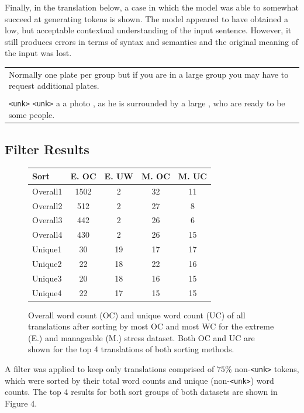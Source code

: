 \documentclass[11pt,a4paper]{article}
\begin{document}
Finally, in the translation below, a case in which the model was able to somewhat succeed at generating tokens is shown. The model appeared to have obtained a  low, but acceptable contextual understanding of the input sentence. However, it still produces errors in terms of syntax and semantics and the original meaning of the input was lost.
\begin{center}
\begin{tabular}{p{2.5in}}
    \hline
    Normally one plate per group but if you are in a large group you may have to request additional plates.\\
    \\
    \verb|<unk>| \verb|<unk>| a a photo , as he is surrounded by a large , who are ready to be some people.\\
    \hline
\end{tabular}
\end{center}


\subsection{Filter Results}
\begin{figure}[h]
    \centering
    \begin{tabular}{| l || c | c || c | c |}
    \hline
    Sort & E. OC & E. UW & M. OC & M. UC\\
    \hline
    \hline
    Overall1 & 1502 & 2 & 32 & 11\\
    Overall2 & 512 & 2 & 27 & 8\\
    Overall3 & 442 & 2 & 26 & 6\\
    Overall4 & 430 & 2 & 26 & 15\\
    \hline
    Unique1 & 30 & 19 & 17 & 17\\
    Unique2 & 22 & 18 & 22 & 16\\
    Unique3 & 20 & 18 & 16 & 15\\
    Unique4 & 22 & 17 & 15 & 15\\
    \hline
    \end{tabular}
    \caption{Overall word count (OC) and unique word count (UC) of all translations after sorting by most OC and most WC for the extreme (E.) and manageable (M.) stress dataset. Both OC and UC are shown for the top 4 translations of both sorting methods.}
\end{figure}
A filter was applied to keep only translations comprised of $75\%$ non-\verb|<unk>| tokens, which were sorted by their total word counts and unique (non-\verb|<unk>|) word counts. The top 4 results for both sort groups of both datasets are shown in Figure 4.
\end{document}
